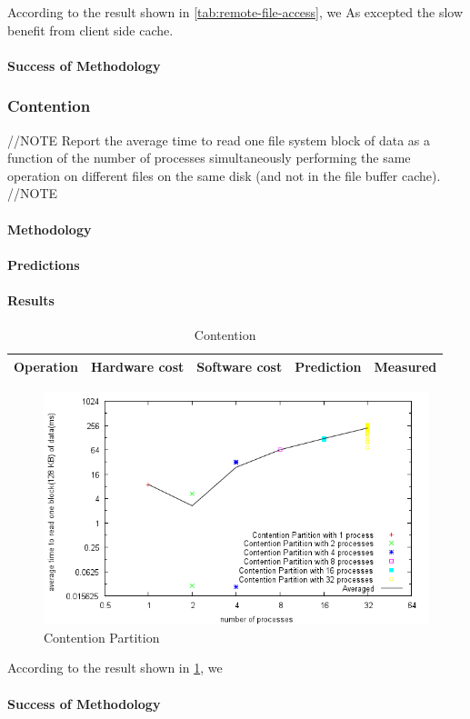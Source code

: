 According to the result shown in \ref{tab:remote-file-access}, we
As excepted the slow benefit from client side cache.
\paragraph{Success of Methodology}



\subsubsection{Contention}
//NOTE
Report the average time to read one file system block of data as a function of the number of processes simultaneously performing the same operation on different files on the same disk (and not in the file buffer cache).
//NOTE

\paragraph{Methodology}

\paragraph{Predictions}
\paragraph{Results}
\begin{table}
\begin{center}
\begin{tabular}{| l | l | l | l | l |}
\hline
Operation & Hardware cost & Software cost & Prediction & Measured \\
\hline
\end{tabular}
\end{center}
\caption{Contention\label{tab:contention}}
\end{table}



\begin{figure}[h]
\begin{center}
\includegraphics[scale=0.8]{contentionPartitionImage}
\end{center}
\caption {Contention Partition\label{fig:contention-partition}}

\end{figure}




According to the result shown in \ref{tab:contention}, we

\paragraph{Success of Methodology}


